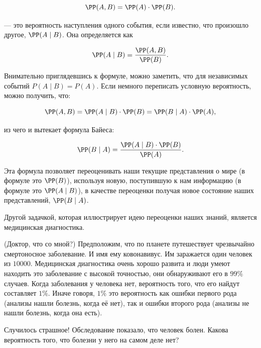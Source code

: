 \documentclass[12pt, a4paper, oneside]{article}
\begin{document}
\[ \PP(A,B) = \PP(A) \cdot \PP(B).\]

 --- это вероятность наступления одного события, если известно, что произошло другое, $\PP(A \mid B)$.  Она определяется как

\[ \PP(A \mid B) = \frac{\PP(A, B)}{\PP(B)}.\]

Внимательно приглядевшись к формуле, можно заметить, что для независимых событий $P(A \mid B) = P(A).$  Если немного переписать условную вероятность, можно получить, что: 

\[ \PP(A, B) = \PP(A \mid B) \cdot \PP(B) = \PP(B \mid A) \cdot \PP(A), \] 

из чего и вытекает формула Байеса:

\[ \PP(B  \mid A) = \frac{\PP(A \mid B) \cdot \PP(B)}{\PP(A)}.\]

Эта формула позволяет переоценивать наши текущие представления о мире (в формуле это $\PP(B)$), используя новую, поступившую к нам информацию (в формуле это $\PP(A \mid B)$), в качестве переоценки получая новое состояние наших представлений, $\PP(B \mid A)$.  

Другой задачкой, которая иллюстрирует идею переоценки наших знаний, является медицинская диагностика. 


\begin{problem}{(Доктор, что со мной?)}
Предположим, что по планете путешествует чрезвычайно смертоносное заболевание. И имя ему ковонавивус. Им заражается один человек из $10 000$.  Медицинская диагностика очень хорошо развита и люди умеют находить это заболевание с высокой точностью, они обнаруживают его в $99\%$ случаев. Когда заболевания у человека нет, вероятность того, что его найдут составляет $1\%$.  Иначе говоря, $1\%$ это вероятность как ошибки первого рода (анализы нашли болезнь, когда её нет), так и ошибки второго рода (анализы не нашли болезнь, когда она есть). 

Случилось страшное! Обследование показало, что человек болен. Какова вероятность того, что болезни у него на самом деле нет? 
\end{problem}
\end{document}

